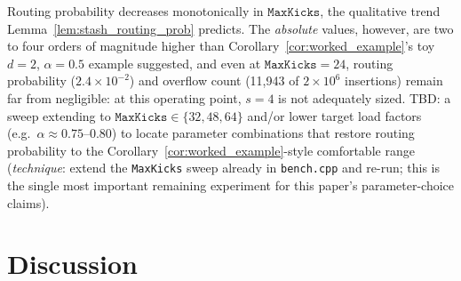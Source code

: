 \documentclass[conference]{IEEEtran}
\begin{document}
	\begin{table}[htbp]
		\caption{$\mathtt{MaxKicks}$ Sensitivity, Measured ($d{=}3$, $\alpha\!\approx\!0.86$--$0.87$, $s{=}4$, $N{=}2\times10^6$)}
		\label{tab:sensitivity_analysis}
		\centering
	\end{table}
	
	Routing probability decreases monotonically in $\mathtt{MaxKicks}$,
	the qualitative trend Lemma~\ref{lem:stash_routing_prob} predicts. The
	\emph{absolute} values, however, are two to four orders of magnitude
	higher than Corollary~\ref{cor:worked_example}'s toy $d=2$, $\alpha=0.5$
	example suggested, and even at $\mathtt{MaxKicks}=24$, routing
	probability ($2.4\times10^{-2}$) and overflow count (11,943 of
	$2\times10^6$ insertions) remain far from negligible: at this
	operating point, $s=4$ is not adequately sized. TBD: a sweep extending
	to $\mathtt{MaxKicks}\in\{32,48,64\}$ and/or lower target load factors
	(e.g.\ $\alpha\approx0.75$--$0.80$) to locate parameter combinations
	that restore routing probability to the
	Corollary~\ref{cor:worked_example}-style comfortable range
	(\emph{technique}: extend the \texttt{MaxKicks} sweep already in
	\texttt{bench.cpp} and re-run; this is the single most important
	remaining experiment for this paper's parameter-choice claims).
	
	\section{Discussion}
	\label{sec:discussion}
	
\end{document}
